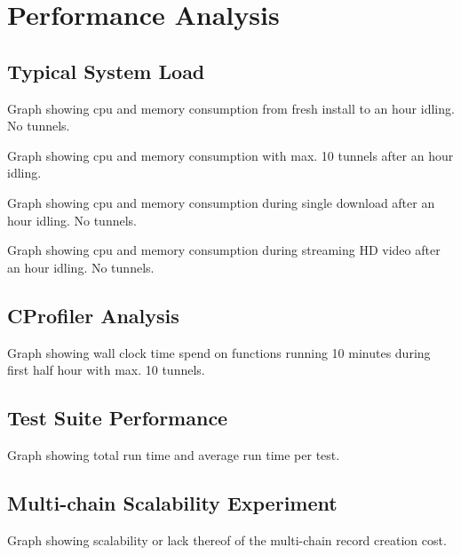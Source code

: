 \documentclass[]{report}
\begin{document}
\chapter{Performance Analysis}

\section{Typical System Load}
Graph showing cpu and memory consumption from fresh install to an hour idling. No tunnels.

Graph showing cpu and memory consumption with max. 10 tunnels after an hour idling.

Graph showing cpu and memory consumption during single download after an hour idling. No tunnels.

Graph showing cpu and memory consumption during streaming HD video after an hour idling. No tunnels.


\section{CProfiler Analysis}
Graph showing wall clock time spend on functions running 10 minutes during first half hour with max. 10 tunnels.


\section{Test Suite Performance}
Graph showing total run time and average run time per test.


\section{Multi-chain Scalability Experiment}
Graph showing scalability or lack thereof of the multi-chain record creation cost.
\end{document}
